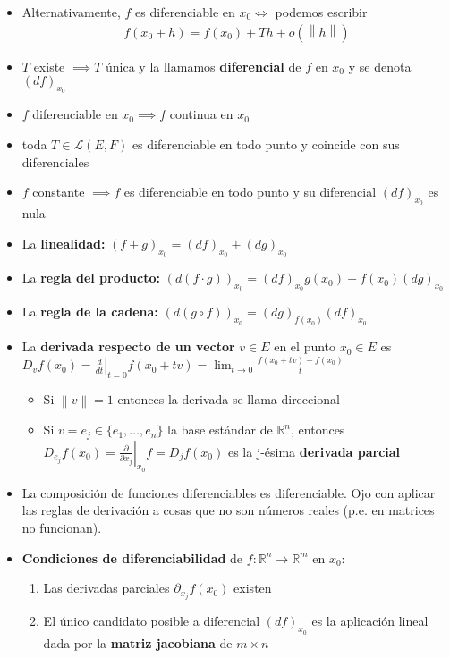 \documentclass[a4paper,twocolumn]{extarticle}
\newcommand{\R}{\mathbb{R}}
\newcommand{\norma}[1]{\left\lVert#1\right\rVert}
\newcommand{\lacot}[1]{\mathcal{L}(#1)}
\begin{document}
\begin{itemize}
	\item Alternativamente, $f$ es diferenciable en $x_0 \iff$ podemos escribir
	\begin{align*}
		f(x_0 + h) = f(x_0) + Th + o(\norma{h})
	\end{align*}
	\item $T$ existe $\implies T$ única y la llamamos \textbf{diferencial} de $f$ en $x_0$ y se denota $(df)_{x_0}$
	\item $f$ diferenciable en $x_0 \implies f$ continua en $x_0$
	\item toda $T \in \lacot{E,F}$ es diferenciable en todo punto y coincide con sus diferenciales
	\item $f$ constante $\implies f$ es diferenciable en todo punto y su diferencial $(df)_{x_0}$ es nula
	\item La \textbf{linealidad:} $(f + g)_{x_0} = (df)_{x_0} + (dg)_{x_0}$
	\item La \textbf{regla del producto:} $(d(f\cdot g))_{x_0} = (df)_{x_0}g(x_0) + f(x_0)(dg)_{x_0}$
	\item La \textbf{regla de la cadena:} $(d(g \circ f))_{x_0} = (dg)_{f(x_0)} (df)_{x_0}$
	\item La \textbf{derivada respecto de un vector} $v \in E$ en el punto $x_0 \in E$ es $D_vf(x_0) = \left.\frac{d}{dt}\right|_{t=0}f(x_0 + tv) = \lim_{t \to 0} \frac{f(x_0 + tv) - f(x_0)}{t}$
	\begin{itemize}
		\item Si $\norma{v} = 1$ entonces la derivada se llama direccional
		\item Si $v = e_j \in \{e_1, \dots, e_n\}$ la base estándar de $\R^n$, entonces $D_{e_j}f(x_0) = \left.\frac{\partial}{\partial x_j}\right|_{x_0}f = D_jf(x_0)$ es la j-ésima \textbf{derivada parcial}
	\end{itemize}
	\item La composición de funciones diferenciables es diferenciable. Ojo con aplicar las reglas de derivación a cosas que no son números reales (p.e. en matrices no funcionan).
	\item \textbf{Condiciones de diferenciabilidad} de $f:\R^n \to \R^m$ en $x_0$:
	\begin{enumerate}
		\item Las derivadas parciales $\partial_{x_j}f(x_0)$ existen
		\item El único candidato posible a diferencial $(df)_{x_0}$ es la aplicación lineal dada por la \textbf{matriz jacobiana} de $m \times n$

\end{enumerate}
\end{itemize}
\end{document}
